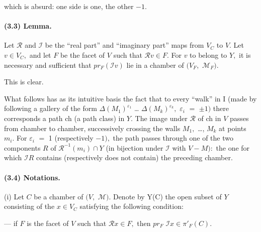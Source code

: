 \documentclass[10pt,a4paper]{article}
\begin{document}
which is absurd: one side is one, the other \ensuremath{-1.}\par

\paragraph{(3.3) Lemma.} Let \ensuremath{\mathcal{R}} and \ensuremath{\mathcal{I}} be the ``real part'' and ``imaginary part'' maps from \ensuremath{V_C} to \ensuremath{V.} Let \ensuremath{v\in{}V_C,} and let \ensuremath{F} be the facet of \ensuremath{V} such that \ensuremath{\mathcal{R}v\in{}F.} For \ensuremath{v} to belong to \ensuremath{Y,} it is necessary and sufficient that \ensuremath{pr_F(\mathcal{I}v)} lie in a chamber of \ensuremath{(V_F,} \ensuremath{\mathcal{M}_F).}

This is clear.\par

What follows has as its intuitive basis the fact that to every ``walk'' in I (made by following a gallery of the form \ensuremath{\Delta{}(M_1)^{\varepsilon{}_1}} \ldots{} \ensuremath{\Delta{}(M_k)^{\varepsilon{}_k},} \ensuremath{\varepsilon{}_i} \ensuremath{=} \ensuremath{\pm1)} there corresponds a path ch (a path class) in \ensuremath{Y.} The image under \ensuremath{\mathcal{R}} of ch in \ensuremath{V} passes from chamber to chamber, successively crossing the walls \ensuremath{M_1,} \ldots{}, \ensuremath{M_k} at points \ensuremath{m_i.} For \ensuremath{\varepsilon{}_i} \ensuremath{=} 1 (respectively \ensuremath{-1),} the path passes through one of the two components \ensuremath{R} of \ensuremath{\mathcal{R}^{-1}(m_i)\cap{}Y} (in bijection under \ensuremath{\mathcal{I}} with \ensuremath{V-M):} the one for which \ensuremath{\mathcal{I}R} contains (respectively does not contain) the preceding chamber.\par

\paragraph{(3.4) Notations.} (i) Let \ensuremath{C} be a chamber of \ensuremath{(V,} \ensuremath{\mathcal{M}).} Denote by Y(C) the open subset of \ensuremath{Y} consisting of the \ensuremath{x\in{}V_C} satisfying the following condition:

--- if \ensuremath{F} is the facet of \ensuremath{V} such that \ensuremath{\mathcal{R}x\in{}F,} then \ensuremath{pr_F} \ensuremath{\mathcal{I}x\in{}\pi{}'_F(C).}\par
\end{document}

